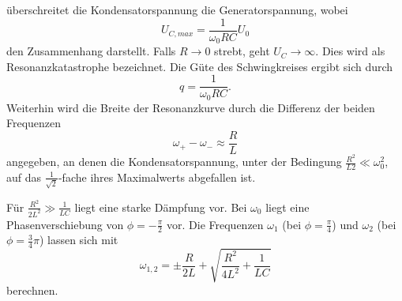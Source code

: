 überschreitet die Kondensatorspannung die Generatorspannung, wobei 
\begin{equation}
    U_{C,max} = \frac{1}{\omega_0 RC} U_0 
\end{equation}
\noindent
den Zusammenhang darstellt. Falls $R \rightarrow 0$ strebt, geht $U_C \rightarrow \infty$. Dies 
wird als Resonanzkatastrophe bezeichnet. Die Güte des Schwingkreises ergibt sich durch
\begin{equation}
    q = \frac{1}{\omega_0 RC}.
    \label{eq:b1}
\end{equation}
\noindent
Weiterhin wird die Breite der Resonanzkurve durch die Differenz der beiden Frequenzen 
\begin{equation}
    \omega_+ - \omega_- \approx \frac{R}{L}
\end{equation}
angegeben, an denen die Kondensatorspannung, unter der Bedingung 
$\frac{R^{2}}{L{2}} \ll \omega_0^{2}$, auf das $\frac{1}{\sqrt{2}}$-fache
ihres Maximalwerts abgefallen ist.  

Für $\frac{R^{2}}{2L^{2}} \gg \frac{1}{LC}$ liegt eine starke Dämpfung vor. Bei $\omega_0$ liegt
eine Phasenverschiebung von $\phi = -\frac{\pi}{2}$ vor. Die Frequenzen $\omega_1$ (bei $\phi = \frac{\pi}{4}$) und
$\omega_2$ (bei $\phi = \frac{3}{4}\pi$) lassen sich mit 
\begin{equation}
    \omega_{1,2} = \pm \frac{R}{2L} + \sqrt{\frac{R^{2}}{4L^{2}}+\frac{1}{LC}}
\end{equation}
\noindent berechnen.
